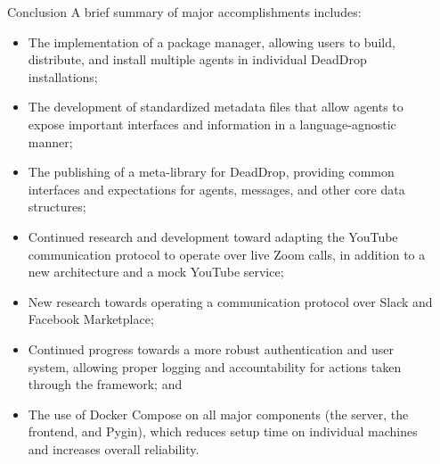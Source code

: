 \documentclass[final]{beamer}
\newlength{\sepwidth}
\newlength{\colwidth}
\newcommand{\separatorcolumn}{\begin{column}{\sepwidth}\end{column}}
\begin{document}
\begin{frame}[t]
\begin{columns}[t]
\begin{column}{\colwidth}
\begin{block}{Conclusion}
    A brief summary of major accomplishments includes:
    \begin{itemize}
      \item
        The implementation of a package manager, allowing users to build, distribute, and install multiple agents in individual DeadDrop installations;
      \item
        The development of standardized metadata files that allow agents to expose important interfaces and information in a language-agnostic manner;
      \item
        The publishing of a meta-library for DeadDrop, providing common interfaces and expectations for agents, messages, and other core data structures;
      \item
        Continued research and development toward adapting the YouTube communication protocol to operate over live Zoom calls, in addition to a new architecture and a mock YouTube service;
      \item
        New research towards operating a communication protocol over Slack and Facebook Marketplace;
      \item
        Continued progress towards a more robust authentication and user system, allowing proper logging and accountability for actions taken through the framework; and
      \item
        The use of Docker Compose on all major components (the server, the frontend, and Pygin), which reduces setup time on individual machines and increases overall reliability.
    \end{itemize}


  \end{block}

  

\end{column}

\separatorcolumn
\end{columns}
\end{frame}
\end{document}
